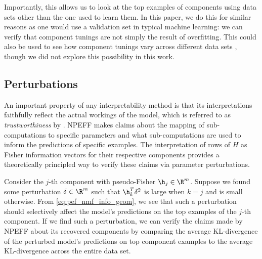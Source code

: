 \documentclass[dvipsnames]{article}
\begin{document}
Importantly, this allows us to look at the top examples of components using data sets other than the one used to learn them.
In this paper, we do this for similar reasons as one would use a validation set in typical machine learning: we can verify that component tunings are not simply the result of overfitting.
This could also be used to see how component tunings vary across different data sets \citep{bolukbasi2021interpretability}, though we did not explore this possibility in this work.

\subsection{Perturbations}\label{sec:methods_perturbations}
An important property of any interpretability method is that its interpretations faithfully reflect the actual workings of the model, which is referred to as \textit{trustworthiness} by \citep{li2022interpretable}.
NPEFF makes claims about the mapping of sub-computations to specific parameters and what sub-computations are used to inform the predictions of specific examples.
The interpretation of rows of $H$ as Fisher information vectors for their respective components provides a theoretically principled way to verify these claims via parameter perturbations.

Consider the $j$-th component with pseudo-Fisher $\h_j \in \R^m$.
Suppose we found some perturbation $\delta \in \R^m$ such that $\h_k^T\delta^2$ is large when $k=j$ and is small otherwise.
From \eqref{eq:pef_nmf_info_geom}, we see that such a perturbation should selectively affect the model's predictions on the top examples of the $j$-th component.
If we find such a perturbation, we can verify the claims made by NPEFF about its recovered components by comparing the average KL-divergence of the perturbed model's predictions on top component examples to the average KL-divergence across the entire data set.
\end{document}
